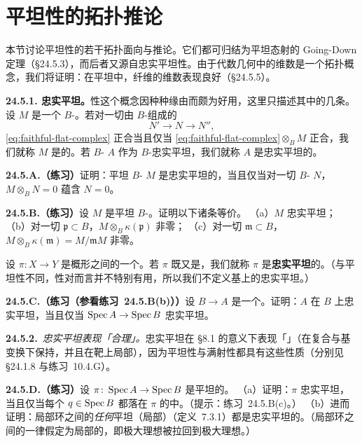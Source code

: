 
\section{平坦性的拓扑推论}

本节讨论平坦性的若干拓扑面向与推论。它们都可归结为平坦态射的 Going-Down 定理（\S24.5.3），而后者又源自忠实平坦性。由于代数几何中的维数是一个拓扑概念，我们将证明：在平坦\trFamily{}中，纤维的维数表现良好（\S24.5.5）。

\textbf{24.5.1. 忠实平坦。}\quad \trFaithfullyFlat{}性这个概念因种种缘由而颇为好用，这里只描述其中的几条。设 $M$ 是一个 $B$-\trModule。若对一切由 $B$-\trModule{}组成的\trComplexN
\[
\tag{24.5.1.1}\label{eq:faithful-flat-complex}
N' \longrightarrow N \longrightarrow N'',
\]
\eqref{eq:faithful-flat-complex} 正合当且仅当 \eqref{eq:faithful-flat-complex}$\otimes_B M$ 正合，我们就称 $M$ 是\textbf{\trFaithfullyFlat}的。若 $B$-\trAlgebra{} $A$ 作为 $B$-\trModule{}忠实平坦，我们就称 $A$ 是忠实平坦的。

\textbf{24.5.A.（练习）}\quad 证明：平坦 $B$-\trModule{} $M$ 是忠实平坦的，当且仅当对一切 $B$-\trModule{} $N$，$M\otimes_B N=0$ 蕴含 $N=0$。

\textbf{24.5.B.（练习）}\quad 设 $M$ 是平坦 $B$-\trModule。证明以下诸条等价。
（a）$M$ 忠实平坦；
（b）对一切\trPrimeIdeal{} $\mathfrak{p}\subset B$，$M\otimes_B\kappa(\mathfrak{p})$ 非零；
（c）对一切\trMaximalIdeal{} $\mathfrak{m}\subset B$，$M\otimes_B\kappa(\mathfrak{m})=M/\mathfrak{m}M$ 非零。

设 $\pi\colon X\to Y$ 是概形之间的一个\trMorphism。若 $\pi$ 既\trFlat{}又是\trSurjectiveMap，我们就称 $\pi$ 是\textbf{忠实平坦}的。（与平坦性不同，\trFaithfullyFlat{}性对\trQCSheaf{}而言并不特别有用，所以我们不定义基上的忠实平坦\trQCSheaf。）

\textbf{24.5.C.（练习（参看\mbox{练习~24.5.B}(b)））}\quad 设 $B\to A$ 是一个\trRingMorphism。证明：$A$ 在 $B$ 上忠实平坦，当且仅当 $\operatorname{Spec} A\to\operatorname{Spec} B$ 忠实平坦。

\textbf{24.5.2.}\ \emph{忠实平坦\trMorphism{}表现「合理」。}\quad 忠实平坦\trMorphism{}在 \S8.1 的意义下表现「\trReasonable」（在复合与基变换下保持，并且在靶上局部），因为平坦性与满射性都具有这些性质（分别见 \S24.1.8 与\mbox{练习~10.4.G}）。

\textbf{24.5.D.（练习）}\quad 设 $\pi\colon\operatorname{Spec} A\to\operatorname{Spec} B$ 是平坦的。
（a）证明：$\pi$ 忠实平坦，当且仅当每个\trClosedPoint{} $q\in\operatorname{Spec} B$ 都落在 $\pi$ 的\trImage{}中。（提示：\mbox{练习~24.5.B}(c)。）
（b）进而证明：局部环之间的\emph{任何}平坦（局部）\trMorphism（\mbox{定义~7.3.1}）都是忠实平坦的。（局部环之间的\trMorphism{}一律假定为局部的，即极大理想被拉回到极大理想。）

